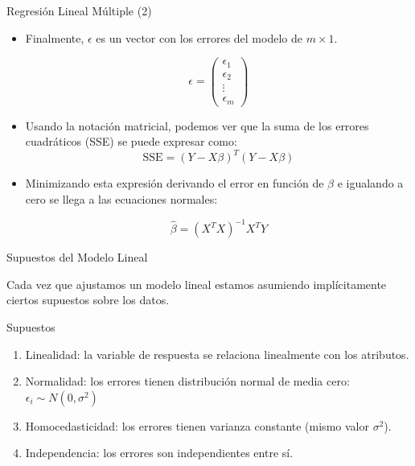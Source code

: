 \documentclass[handout]{beamer}
\begin{document}
\begin{frame}{Regresión Lineal Múltiple (2)}
\scriptsize{
\begin{itemize}
\item Finalmente, $\epsilon$ es un vector con los errores del modelo de $m \times 1$. 

\begin{displaymath}
 \epsilon =
 \begin{pmatrix}
  \epsilon_{1}  \\
  \epsilon_{2}  \\
  \vdots    \\
  \epsilon_{m} 
 \end{pmatrix}
\end{displaymath}

\item Usando la notación matricial, podemos ver que la suma de los errores cuadráticos (SSE) se puede expresar como:
\begin{displaymath}
 \text{SSE} = (Y - X\beta)^{T}(Y-X\beta)
\end{displaymath}

\item Minimizando esta expresión derivando el error en función de $\beta$ e igualando a cero se llega a las ecuaciones normales:

\begin{displaymath}
   \hat{\beta} = (X^{T}X)^{-1} X^{T}Y
\end{displaymath}


\end{itemize}


}

\end{frame}

\begin{frame}{Supuestos del Modelo Lineal}
\scriptsize{





Cada vez que ajustamos un modelo lineal estamos asumiendo implícitamente ciertos supuestos sobre los datos. 


\begin{block}{Supuestos}
\begin{enumerate}
\item Linealidad: la variable de respuesta se relaciona linealmente con los atributos. 
\item Normalidad: los errores tienen distribución normal de media cero: $\epsilon_{i} \sim N(0,\sigma^2)$ 
\item Homocedasticidad: los errores tienen  varianza constante (mismo valor $\sigma^2$).
\item Independencia: los errores son independientes entre sí.
 
\end{enumerate}
 
\end{block}

} 
\end{frame}
\end{document}
